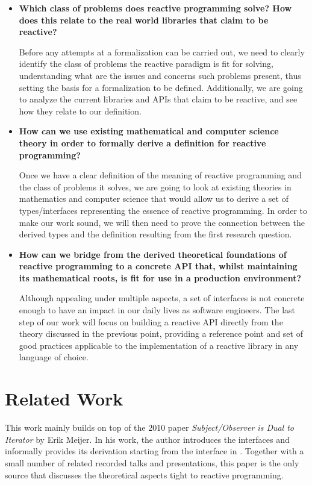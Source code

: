 \begin{itemize}
\item \textbf{Which class of problems does reactive programming solve? How does this relate to the real world libraries that claim to be reactive?}

Before any attempts at a formalization can be carried out, we need to clearly identify the class of problems the reactive paradigm is fit for solving, understanding what are the issues and concerns such problems present, thus setting the basis for a formalization to be defined. Additionally, we are going to analyze the current libraries and APIs that claim to be reactive, and see how they relate to our definition.

\item \textbf{How can we use existing mathematical and computer science theory in order to formally derive a definition for reactive programming?}

Once we have a clear definition of the meaning of reactive programming and the class of problems it solves, we are going to look at existing theories in mathematics and computer science that would allow us to derive a set of types/interfaces representing the essence of reactive programming. In order to make our work sound, we will then need to prove the connection between the derived types and the definition resulting from the first research question.

\item \textbf{How can we bridge from the derived theoretical foundations of reactive programming to a concrete API that, whilst maintaining its mathematical roots, is fit for use in a production environment?}

Although appealing under multiple aspects, a set of interfaces is not concrete enough to have an impact in our daily lives as software engineers. The last step of our work will focus on building a reactive API directly from the theory discussed in the previous point, providing a reference point and set of good practices applicable to the implementation of a reactive library in any language of choice.

\end{itemize}

\section*{Related Work}

This work mainly builds on top of the 2010 paper \textit{Subject/Observer is Dual to Iterator} by Erik Meijer\cite{meijer2010observable}. In his work, the author introduces the  interfaces and informally provides its derivation starting from the  interface in . Together with a small number of related recorded talks and presentations\cite{E2E-Rx,meijer2014reactive,meijer2014-Duality-And-The-End-Of-Reactive}, this paper is the only source that discusses the theoretical aspects tight to reactive programming. 

